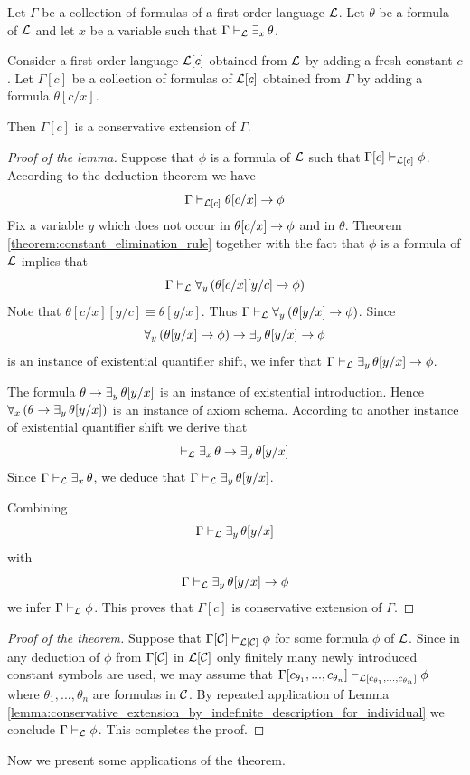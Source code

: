 \documentclass[10pt]{amsart}
\begin{document}
\begin{lemma}\label{lemma:conservative_extension_by_indefinite_description_for_individual}
	Let $\Gamma$ be a collection of formulas of a first-order language ${\mathcal L}$. Let $\theta$ be a formula of ${\mathcal L}$ and let $x$ be a variable such that $\Gamma \vdash_{{\mathcal L}}\exists_x\,\theta$. 

  Consider a first-order language ${\mathcal L}[c]$ obtained from ${\mathcal L}$ by adding a fresh constant $c$. Let $\Gamma[c]$ be a collection of formulas of ${\mathcal L}[c]$ obtained from $\Gamma$ by adding a formula $\theta[c/x]$. 

  Then $\Gamma[c]$ is a conservative extension of $\Gamma$.
\end{lemma}
\begin{proof}[Proof of the lemma]
	Suppose that $\phi$ is a formula of ${\mathcal L}$ such that $\Gamma[c]\vdash_{{\mathcal L}[c]}\phi$. According to the deduction theorem we have
	$$\Gamma \vdash_{{\mathcal L}[c]}\theta[c/x]\rightarrow \phi$$
	Fix a variable $y$ which does not occur in $\theta[c/x]\rightarrow \phi$ and in $\theta$. Theorem \ref{theorem:constant_elimination_rule} together with the fact that $\phi$ is a formula of ${\mathcal L}$ implies that
	$$\Gamma \vdash_{{\mathcal L}} \forall_y\left(\theta[c/x][y/c]\rightarrow \phi\right)$$
	Note that $\theta[c/x][y/c] \equiv \theta[y/x]$. Thus $\Gamma \vdash_{{\mathcal L}} \forall_y\left(\theta[y/x] \rightarrow \phi\right)$. Since
	$$\forall_y\left(\theta[y/x] \rightarrow \phi\right) \rightarrow \exists_y\,\theta[y/x] \rightarrow \phi$$
	is an instance of existential quantifier shift, we infer that $\Gamma \vdash_{{\mathcal L}} \exists_y\,\theta[y/x] \rightarrow \phi$.

	The formula $\theta \rightarrow \exists_y\,\theta[y/x]$ is an instance of existential introduction. Hence $\forall_x\left(\theta \rightarrow \exists_y\,\theta[y/x]\right)$
	is an instance of axiom schema. According to another instance of existential quantifier shift we derive that
	$$\vdash_{{\mathcal L}}\exists_x\,\theta \rightarrow \exists_y\,\theta[y/x]$$
	Since $\Gamma \vdash_{{\mathcal L}}\exists_x\,\theta$, we deduce that $\Gamma \vdash_{{\mathcal L}} \exists_y\,\theta[y/x]$.

	Combining
	$$\Gamma \vdash_{{\mathcal L}} \exists_y\,\theta[y/x]$$
	with
	$$\Gamma\vdash_{{\mathcal L}} \exists_y\,\theta[y/x] \rightarrow \phi$$
	we infer $\Gamma \vdash_{{\mathcal L}} \phi$. This proves that $\Gamma[c]$ is conservative extension of $\Gamma$.
\end{proof}

\begin{proof}[Proof of the theorem]
  Suppose that $\Gamma[{\mathcal C}] \vdash_{{\mathcal L}[{\mathcal C}]} \phi$ for some formula $\phi$ of ${\mathcal L}$. Since in any deduction of $\phi$ from $\Gamma[{\mathcal C}]$ in ${\mathcal L}[{\mathcal C}]$ only finitely many newly introduced constant symbols are used, we may assume that $\Gamma[c_{\theta_1},...,c_{\theta_n}] \vdash_{{\mathcal L}[c_{\theta_1},...,c_{\theta_n}]}\phi$ where $\theta_1,...,\theta_n$ are formulas in ${\mathcal C}$. By repeated application of Lemma \ref{lemma:conservative_extension_by_indefinite_description_for_individual} we conclude $\Gamma \vdash_{{\mathcal L}}\phi$. This completes the proof.
\end{proof}
\noindent
Now we present some applications of the theorem.
\end{document}
